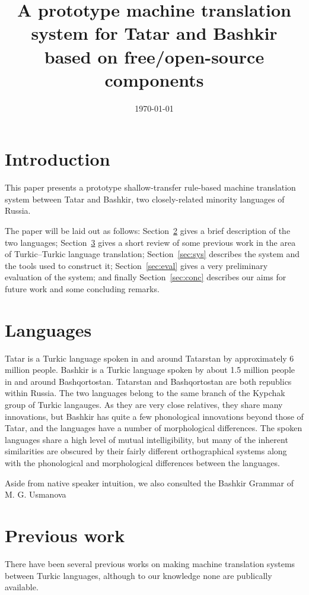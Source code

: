\documentclass[11pt,a4paper]{article}
\title{A prototype machine translation system for Tatar and Bashkir based on 
   free/open-source components}
\date{\today}
\begin{document}
\maketitleabstract

\section{Introduction}

This paper presents a prototype shallow-transfer rule-based machine translation
system between Tatar and Bashkir, two closely-related minority languages of Russia.

The paper will be laid out as follows: Section~\ref{sec:lang} gives a brief description
of the two languages; Section~\ref{sec:prev} gives a short review of some previous
work in the area of Turkic--Turkic language translation; Section~\ref{sec:sys} 
describes the system and the tools used to construct it; Section~\ref{sec:eval}
gives a very preliminary evaluation of the system; and finally Section~\ref{sec:conc}
describes our aims for future work and some concluding remarks.

\section{Languages}
\label{sec:lang}

Tatar is a Turkic language spoken in and around Tatarstan by approximately 6 million people.  Bashkir is a Turkic language spoken by about 1.5 million people in and around Bashqortostan.  Tatarstan and Bashqortostan are both republics within Russia.  The two languages belong to the same branch of the Kypchak group of Turkic langauges.  As they are very close relatives, they share many innovations, but Bashkir has quite a few phonological innovations beyond those of Tatar, and the languages have a number of morphological differences.  The spoken languages share a high level of mutual intelligibility, but many of the inherent similarities are obscured by their fairly different orthographical systems along with the phonological and morphological differences between the languages.

Aside from native speaker intuition, we also consulted the Bashkir Grammar of M. G. Usmanova \cite{usmanova06}

\section{Previous work}
\label{sec:prev}

There have been several previous works on making machine translation systems between 
Turkic languages, although to our knowledge none are publically available. 
\end{document}
